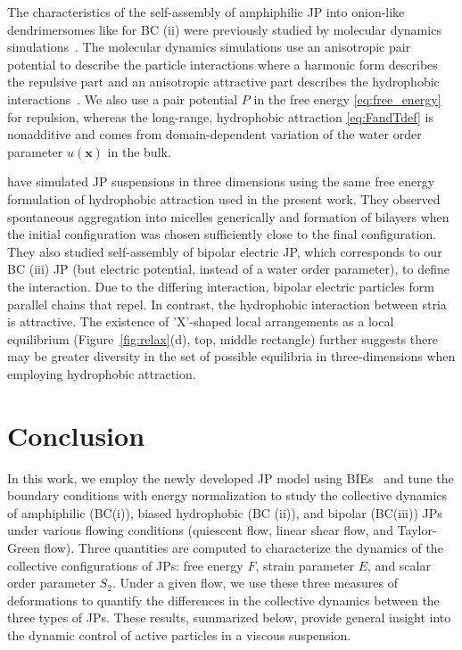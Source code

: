 \documentclass[prb,preprint,showpacs,preprintnumbers,amsmath,amssymb,longbibliography]{revtex4-1}
\newcommand{\xx}{\mathbf{x}}
\begin{document}
The characteristics of the self-assembly of amphiphilic JP into
onion-like dendrimersomes like for BC (ii) were previously studied by molecular dynamics
simulations~\cite{C9NR05885K}. The molecular dynamics simulations use an
anisotropic pair potential to describe the particle interactions
where a harmonic form describes the repulsive part and an anisotropic
attractive part describes the hydrophobic interactions~\cite{HongCacciutoLuijtenGranick2008}.
We also use a pair potential $P$ in the free energy \eqref{eq:free_energy} for repulsion,
whereas the long-range, hydrophobic attraction \eqref{eq:FandTdef}
is nonadditive and comes from domain-dependent variation of
the water order parameter $u(\xx)$ in the bulk.


\citet{kohl-cor-che-vee22} have simulated JP suspensions in three
dimensions using the same free energy formulation of hydrophobic
attraction used in the present work. They observed spontaneous
aggregation into micelles generically and formation of bilayers when the
initial configuration was chosen sufficiently close to the final
configuration. They also studied self-assembly of bipolar electric JP,
which corresponds to our BC (iii) JP (but electric potential, instead of a water order parameter),
to define the interaction.  Due to the differing interaction,
bipolar electric particles form parallel chains that
repel. In contrast, the hydrophobic interaction between stria is
attractive. The existence of 'X'-shaped local arrangements as a local
equilibrium (Figure~\ref{fig:relax}(d), top, middle rectangle) further
suggests there may be greater diversity in the set of possible
equilibria in three-dimensions when employing hydrophobic attraction.



\section{Conclusion}
\label{sec:conclusion}

In this work, we employ the newly developed JP model using
BIEs~\cite{Fu20, Fu2022_JFM} and tune the boundary conditions with
energy normalization to study the collective dynamics of amphiphilic
(BC(i)), biased hydrophobic (BC (ii)), and bipolar (BC(iii)) JPs under
various flowing conditions (quiescent flow, linear shear flow, and
Taylor-Green flow). Three quantities are computed to characterize the
dynamics of the collective configurations of JPs: free energy $F$,
strain parameter $E$, and scalar order parameter $S_2$. 
Under a given flow, we use these three measures of deformations to
quantify the differences in the collective dynamics between the three
types of JPs. These results, summarized below, provide general insight
into the dynamic control of active particles in a viscous suspension.
\end{document}
